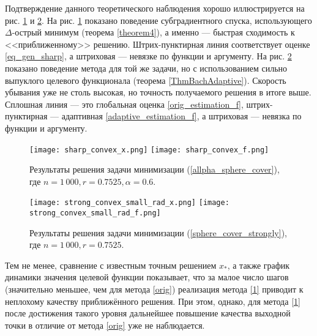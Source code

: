 Подтверждение данного теоретического наблюдения хорошо иллюстрируется на рис. \ref{res_sharp_convex} и \ref{res_strong_convex}. На рис. \ref{res_sharp_convex} показано поведение субградиентного спуска, использующего $\Delta$-острый минимум (теорема \ref{theorem4}), а именно --- быстрая сходимость к <<приближенному>> решению. Штрих-пунктирная линия соответствует оценке \eqref{eq_gen_sharp}, а штриховая --- невязке по функции и аргументу. На рис. \ref{res_strong_convex} показано поведение метода для той же задачи, но с использованием сильно выпуклого целевого функционала (теорема \ref{ThmBachAdaptive}). Скорость убывания уже не столь высокая, но точность получаемого решения в итоге выше. Сплошная линия --- это глобальная оценка \eqref{orig_estimation_f}, штрих-пунктирная --- адаптивная \eqref{adaptive_estimation_f}, а штриховая --- невязка по функции и аргументу.

\begin{figure}[H]
	\texttt{[image: sharp\_convex\_x.png]}
	\endminipage\hfill
	\texttt{[image: sharp\_convex\_f.png]}
	\endminipage\hfill
	\caption{ Результаты решения задачи минимизации (\ref{allpha_sphere_cover}), где  $n= 1\,000, r = 0.7525, \alpha = 0.6$.}
	\label{res_sharp_convex}
\end{figure}

\begin{figure}[H]
	\texttt{[image: strong\_convex\_small\_rad\_x.png]}
	\endminipage\hfill
	\texttt{[image: strong\_convex\_small\_rad\_f.png]}
	\endminipage\hfill
	\caption{ Результаты решения задачи минимизации (\ref{sphere_cover_strongly}), где  $n= 1\,000, r = 0.7525$.}
	\label{res_strong_convex}
\end{figure}

Тем не менее, сравнение с известным точным решением $x_*$, а также график динамики значения целевой функции показывает, что за малое число шагов (значительно меньшее, чем для метода \eqref{orig}) реализация метода \eqref{1} приводит к неплохому качеству приближённого решения. При этом, однако, для метода \eqref{1} после достижения такого уровня дальнейшее повышение качества выходной точки в отличие от метода \eqref{orig} уже не наблюдается.

\FloatBarrier